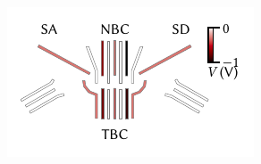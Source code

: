 \begin{marginfigure}[*-7]
    \centering
    \includegraphics{img/pdf/setup/diamonds_gl}
    \caption[]{
        Gate layout of a quadruple \acrlong{qd} with two charge sensor \glspl{qd} from .
        Ohmic contacts used for transport measurements are right (left) of SA (SD).
        NBC and TBC are the gates in the middle of the top and bottom rows.
        The gates are colored according to the voltages applied with the device hosting a single large \gls{qd} in the few-electron, sequential tunneling regime.
    }
    \label{fig:setup:cooling:etemp:gl}
\end{marginfigure}

